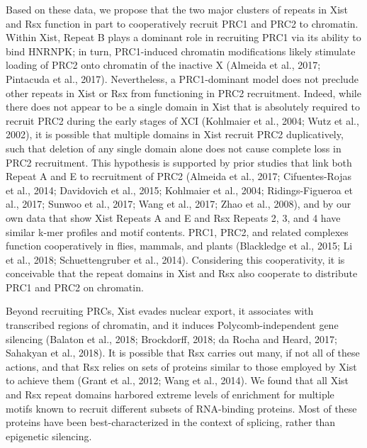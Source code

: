 Based on these data, we propose that the two major clusters of repeats in Xist and Rsx function in part to cooperatively recruit PRC1 and PRC2 to chromatin. Within Xist, Repeat B plays a dominant role in recruiting PRC1 via its ability to bind HNRNPK; in turn, PRC1-induced chromatin modifications likely stimulate loading of PRC2 onto chromatin of the inactive X (Almeida et al., 2017; Pintacuda et al., 2017). Nevertheless, a PRC1-dominant model does not preclude other repeats in Xist or Rsx from functioning in PRC2 recruitment. Indeed, while there does not appear to be a single domain in Xist that is absolutely required to recruit PRC2 during the early stages of XCI (Kohlmaier et al., 2004; Wutz et al., 2002), it is possible that multiple domains in Xist recruit PRC2 duplicatively, such that deletion of any single domain alone does not cause complete loss in PRC2 recruitment. This hypothesis is supported by prior studies that link both Repeat A and E to recruitment of PRC2 (Almeida et al., 2017; Cifuentes-Rojas et al., 2014; Davidovich et al., 2015; Kohlmaier et al., 2004; Ridings-Figueroa et al., 2017; Sunwoo et al., 2017; Wang et al., 2017; Zhao et al., 2008), and by our own data that show Xist Repeats A and E and Rsx Repeats 2, 3, and 4 have similar k-mer profiles and motif contents. PRC1, PRC2, and related complexes function cooperatively in flies, mammals, and plants (Blackledge et al., 2015; Li et al., 2018; Schuettengruber et al., 2014). Considering this cooperativity, it is conceivable that the repeat domains in Xist and Rsx also cooperate to distribute PRC1 and PRC2 on chromatin.

Beyond recruiting PRCs, Xist evades nuclear export, it associates with transcribed regions of chromatin, and it induces Polycomb-independent gene silencing (Balaton et al., 2018; Brockdorff, 2018; da Rocha and Heard, 2017; Sahakyan et al., 2018). It is possible that Rsx carries out many, if not all of these actions, and that Rsx relies on sets of proteins similar to those employed by Xist to achieve them (Grant et al., 2012; Wang et al., 2014). We found that all Xist and Rsx repeat domains harbored extreme levels of enrichment for multiple motifs known to recruit different subsets of RNA-binding proteins. Most of these proteins have been best-characterized in the context of splicing, rather than epigenetic silencing.

